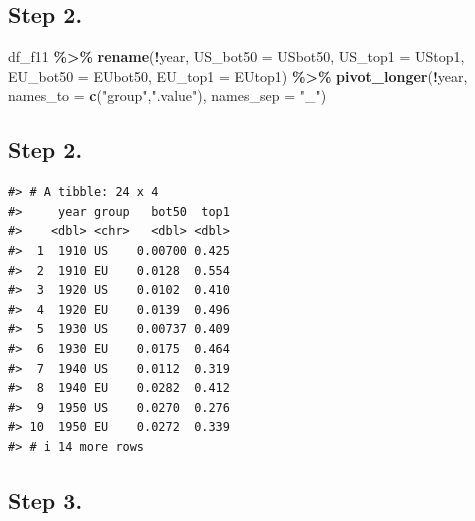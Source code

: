 \documentclass[
  xelatex, ja=standard]{bxjsbook}
\newenvironment{Shaded}{\begin{snugshade}}{\end{snugshade}}
\newcommand{\AttributeTok}[1]{\textcolor[rgb]{0.13,0.29,0.53}{#1}}
\newcommand{\FunctionTok}[1]{\textcolor[rgb]{0.13,0.29,0.53}{\textbf{#1}}}
\newcommand{\NormalTok}[1]{#1}
\newcommand{\SpecialCharTok}[1]{\textcolor[rgb]{0.81,0.36,0.00}{\textbf{#1}}}
\newcommand{\StringTok}[1]{\textcolor[rgb]{0.31,0.60,0.02}{#1}}
\theoremstyle{definition}
\theoremstyle{definition}
\theoremstyle{definition}
\theoremstyle{definition}
\theoremstyle{remark}
\begin{document}
\hypertarget{step-2.}{%
\subsection{Step 2.}\label{step-2.}}

\begin{Shaded}
\begin{Highlighting}[]
\NormalTok{df\_f11 }\SpecialCharTok{\%\textgreater{}\%} 
  \FunctionTok{rename}\NormalTok{(}\SpecialCharTok{!}\NormalTok{year, }\AttributeTok{US\_bot50 =}\NormalTok{ USbot50, }\AttributeTok{US\_top1 =}\NormalTok{ UStop1, }
         \AttributeTok{EU\_bot50 =}\NormalTok{ EUbot50, }\AttributeTok{EU\_top1 =}\NormalTok{ EUtop1) }\SpecialCharTok{\%\textgreater{}\%}
  \FunctionTok{pivot\_longer}\NormalTok{(}\SpecialCharTok{!}\NormalTok{year, }\AttributeTok{names\_to =} \FunctionTok{c}\NormalTok{(}\StringTok{"group"}\NormalTok{,}\StringTok{".value"}\NormalTok{), }\AttributeTok{names\_sep =} \StringTok{"\_"}\NormalTok{)}
\end{Highlighting}
\end{Shaded}

\hypertarget{step-2.-1}{%
\subsection{Step 2.}\label{step-2.-1}}

\begin{verbatim}
#> # A tibble: 24 x 4
#>     year group   bot50  top1
#>    <dbl> <chr>   <dbl> <dbl>
#>  1  1910 US    0.00700 0.425
#>  2  1910 EU    0.0128  0.554
#>  3  1920 US    0.0102  0.410
#>  4  1920 EU    0.0139  0.496
#>  5  1930 US    0.00737 0.409
#>  6  1930 EU    0.0175  0.464
#>  7  1940 US    0.0112  0.319
#>  8  1940 EU    0.0282  0.412
#>  9  1950 US    0.0270  0.276
#> 10  1950 EU    0.0272  0.339
#> # i 14 more rows
\end{verbatim}

\hypertarget{step-3.}{%
\subsection{Step 3.}\label{step-3.}}
\end{document}
